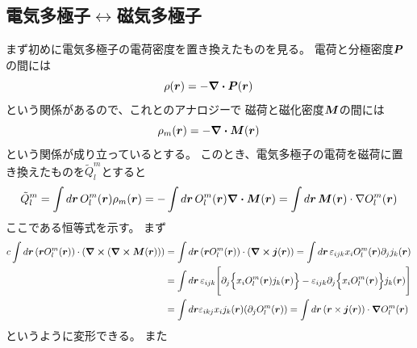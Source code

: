 \documentclass[../../master.tex]{subfiles}
\begin{document}
\subsection{電気多極子\(\leftrightarrow\)磁気多極子}
まず初めに電気多極子の電荷密度を置き換えたものを見る。
電荷と分極密度\(\vb*{P}\)の間には
\begin{equation}
    \rho(\vb*{r}) = -\div\vb*{P}(\vb*{r})
\end{equation}
という関係があるので、これとのアナロジーで
磁荷と磁化密度\(\vb*{M}\)の間には
\begin{equation}
    \rho_m(\vb*{r}) = -\div\vb*{M}(\vb*{r})
\end{equation}
という関係が成り立っているとする。
このとき、電気多極子の電荷を磁荷に置き換えたものを\(\tilde{Q}_l^m\)とすると
\begin{align}
    \tilde{Q}_l^m
    = \int d\vb*{r}\, O_l^m(\vb*{r})\rho_m(\vb*{r})
    = -\int d\vb*{r}\, O_l^m(\vb*{r})\div\vb*{M}(\vb*{r})
    = \int d\vb*{r}\, \vb*{M}(\vb*{r})\cdot \nabla O_l^m(\vb*{r})
\end{align}
ここである恒等式を示す。
まず
\begin{equation}\begin{aligned}[b]
    c\int d\vb*{r}\, (\vb*{r}O_l^m(\vb*{r}))\cdot (\curl (\curl\vb*{M}(\vb*{r})))
    &=\int d\vb*{r}\, (\vb*{r}O_l^m(\vb*{r}))\cdot(\curl \vb*{j}(\vb*{r}))
    =\int d\vb*{r}\, \varepsilon_{ijk} x_i O_l^m(\vb*{r}) \partial_j j_k(\vb*{r})\\
    &= \int d\vb*{r}\,\varepsilon_{ijk} \Biggl[\partial_j \Bigl\{ x_i O_l^m(\vb*{r}) j_k(\vb*{r})\Bigr\}
    -  \varepsilon_{ijk}\partial_j\Bigl\{x_i O_l^m(\vb*{r})\Bigr\} j_k(\vb*{r})\Biggr]\\
    &=\int d\vb*{r}\varepsilon_{ikj} x_i j_k(\vb*{r}) (\partial_j O_l^m(\vb*{r}))
    =\int d\vb*{r}\, (\vb*{r}\times\vb*{j}(\vb*{r}))\cdot \grad O_l^m(\vb*{r})
\end{aligned}\end{equation}
というように変形できる。
また
\end{document}
